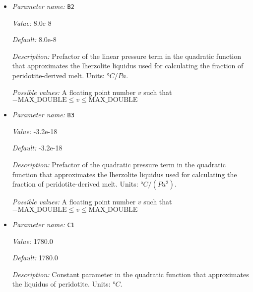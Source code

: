 \begin{itemize}
{\it Value:} 1475.0


{\it Default:} 1475.0


{\it Description:} Constant parameter in the quadratic function that approximates the lherzolite liquidus used for calculating the fraction of peridotite-derived melt. Units: $°C$.


{\it Possible values:} A floating point number $v$ such that $-\text{MAX\_DOUBLE} \leq v \leq \text{MAX\_DOUBLE}$
\item {\it Parameter name:} {\tt B2}
\label{parameters:Material model/Latent heat melt/B2}


{\it Value:} 8.0e-8


{\it Default:} 8.0e-8


{\it Description:} Prefactor of the linear pressure term in the quadratic function that approximates the  lherzolite liquidus used for calculating the fraction of peridotite-derived melt. Units: $°C/Pa$.


{\it Possible values:} A floating point number $v$ such that $-\text{MAX\_DOUBLE} \leq v \leq \text{MAX\_DOUBLE}$
\item {\it Parameter name:} {\tt B3}
\label{parameters:Material model/Latent heat melt/B3}


{\it Value:} -3.2e-18


{\it Default:} -3.2e-18


{\it Description:} Prefactor of the quadratic pressure term in the quadratic function that approximates the  lherzolite liquidus used for calculating the fraction of peridotite-derived melt. Units: $°C/(Pa^2)$.


{\it Possible values:} A floating point number $v$ such that $-\text{MAX\_DOUBLE} \leq v \leq \text{MAX\_DOUBLE}$
\item {\it Parameter name:} {\tt C1}
\label{parameters:Material model/Latent heat melt/C1}


{\it Value:} 1780.0


{\it Default:} 1780.0


{\it Description:} Constant parameter in the quadratic function that approximates the liquidus of peridotite. Units: $°C$.



\end{itemize}
